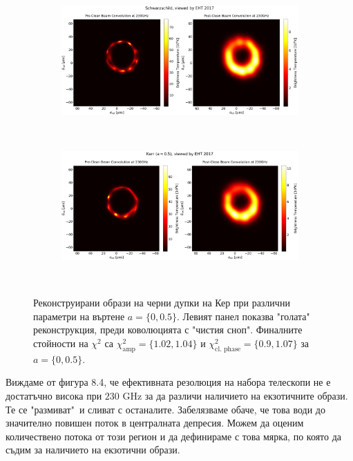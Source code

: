 \begin{figure}[h!]
	\centering
	\begin{subfigure}{12cm}
		\hspace{-1.5cm}
		\includegraphics[scale = 0.23]{Ehtim_plot_2017_no_blur_Sch.png}
	\end{subfigure}\\
	\begin{subfigure}{12cm}
		\hspace{-1.5cm}
		\includegraphics[scale = 0.23]{Ehtim_plot_2017_no_blur_Kerr.png}
	\end{subfigure}\\
	\label{Kerr_EHT_2017}
	\caption[Реконструирани образи на черни дупки на Кер при различни параметри на въртене.]{\small Реконструирани образи на черни дупки на Кер при различни параметри на въртене $a = \{0, 0.5\}$. Левият панел показва "голата"$\,$ реконструкция, преди коволюцията с "чистия сноп". Финалните стойности на $\chi^2$ са $\chi^2_\text{amp} = \{1.02, 1.04\}$ и $\chi^2_\text{cl. phase} = \{0.9, 1.07\}$ за $a = \{0, 0.5\}$.} 
\end{figure}

\newpage

Виждаме от фигура 8.4, че ефективната резолюция на набора телескопи не е достатъчно висока при $230$ GHz за да различи наличието на екзотичните образи. Те се "размиват"$\,$ и сливат с останалите. Забелязваме обаче, че това води до значително повишен поток в централната депресия. Можем да оценим количествено потока от този регион и да дефинираме с това мярка, по която да съдим за наличието на екзотични образи. 


